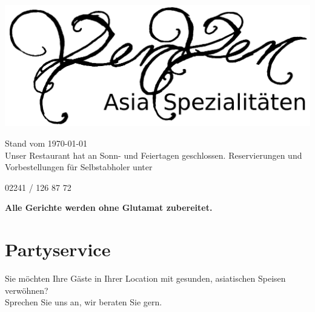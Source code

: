 \documentclass[12pt,a5paper,oneside]{scrreprt}
\begin{document}
 

\begin{center}
\includegraphics[width=\textwidth]{gfx/yenyen_head_bw_text.png}
\end{center}

{\small Stand vom \today}\\[5mm]
Unser Restaurant hat an Sonn- und Feiertagen geschlossen. Reservierungen und Vorbestellungen für Selbstabholer unter
\begin{center}
{\Huge 02241 / 126 87 72}
\end{center}

\textbf{Alle Gerichte werden ohne Glutamat zubereitet.}

\section*{Partyservice}
Sie möchten Ihre Gäste in Ihrer Location mit gesunden, asiatischen Speisen verwöhnen?\\ 
Sprechen Sie uns an, wir beraten Sie gern.
\newpage



\newpage
\end{document}
